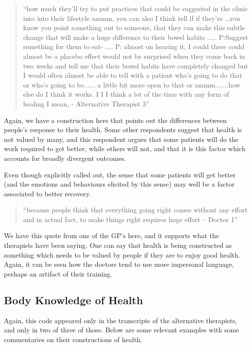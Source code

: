 \begin{quotation}
``how much they'll try to put practices that could be suggested in the clinic into into their lifestyle ammm, you can also I think tell if if they're \ldots you know you point something out to someone, that they can make this subtle  change that will make a huge difference to their bowel habits  
.....
P:Suggest something for them to eat-
....
P: almost on hearing it, I could there could almost be a placebo effect would not be surprised when they come back in two weeks and tell me that their bowel habits have completely changed but I would often almost be able to tell with a patient who's going to do that or who's going to be...... a little bit more open to that or ammm.......how else do I think it works. I I I think a lot of the time with any form of healing I mean, - Alternative Therapist 3''  
\end{quotation}


Again, we have a construction here that points out the differences between people's response to their health. Some other respondents suggest that health is not valued by many, and this respondent argues that some patients will do the work required to get better, while others will not, and that it is this factor which accounts for broadly divergent outcomes. 

Even though explicitly called out, the sense that some patients will get better (and the emotions and behaviours elicited by this sense) may well be a factor associated to better recovery. 

\begin{quotation}
``because people think that everything going right comes without any effort and in actual fact, to make things right requires huge effort – Doctor 1''  
\end{quotation}


We have this quote from one of the GP's here, and it supports what the therapists have been saying. One can say that health is being constructed as something which needs to be valued by people if they are to enjoy good health. Again, it can be seen how the doctors tend to use more impersonal language, perhaps an artifact of their training. 

\subsection{Body Knowledge of Health}

Again, this code appeared only in the transcripts of the alternative therapists, and only in two of three of those. Below are some relevant examples with some commentaries on their constructions of health. 

